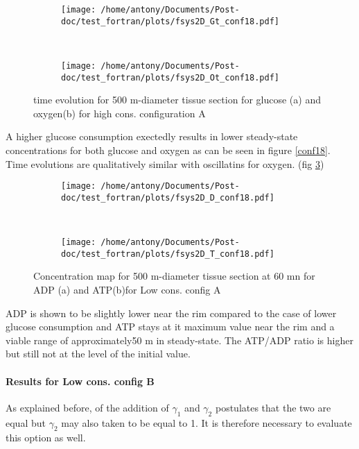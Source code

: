 \documentclass[11pt,a4paper]{article}
\begin{document}
\begin{figure}[ht!]
	\begin{subfigure}{0.45\textwidth}
	\centering
	\texttt{[image: /home/antony/Documents/Post-doc/test\_fortran/plots/fsys2D\_Gt\_conf18.pdf]}
	\caption{ \label{Gt_conf18}}
	\end{subfigure}
	~~
	\begin{subfigure}{0.45\textwidth}
	\texttt{[image: /home/antony/Documents/Post-doc/test\_fortran/plots/fsys2D\_Ot\_conf18.pdf]}
		\caption{ \label{Ot_conf18}}
	\end{subfigure}
	\caption{time evolution for 500 \textmu m-diameter tissue section  for glucose (a) and oxygen(b) for high cons. configuration A \label{tconf18}}
\end{figure}

A higher glucose consumption exectedly results in lower steady-state concentrations for both glucose and oxygen as can be seen in figure \ref{conf18}. Time evolutions are qualitatively similar with oscillatins for oxygen. (fig \ref{tconf18})

\begin{figure}[ht!]
	\begin{subfigure}{0.45\textwidth}
	\centering
	\texttt{[image: /home/antony/Documents/Post-doc/test\_fortran/plots/fsys2D\_D\_conf18.pdf]}
	\caption{ \label{D_conf18}}
	\end{subfigure}
	~~
	\begin{subfigure}{0.45\textwidth}
	\texttt{[image: /home/antony/Documents/Post-doc/test\_fortran/plots/fsys2D\_T\_conf18.pdf]}
		\caption{ \label{T_conf18}}
	\end{subfigure}
	\caption{Concentration map for 500 \textmu m-diameter tissue section at 60 mn for ADP (a) and ATP(b)for Low cons. config A \label{DTconf18}}
\end{figure}

ADP is shown to be slightly lower near the rim compared to the case of lower glucose consumption and ATP stays at it maximum value near the rim and a viable range of  approximately50 \textmu m in steady-state. The ATP/ADP ratio is higher but still not at the level of the initial value.  

\paragraph{Results for Low cons. config B}
As explained before, of the addition of $\gamma_1$ and $\gamma_2$ postulates that the two are equal but $\gamma_2$ may also taken to be equal to 1. It is therefore necessary to evaluate this option as well.
\end{document}
